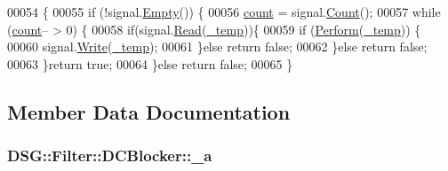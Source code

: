 \begin{DoxyCode}
00054                                                                     \{
00055             \textcolor{keywordflow}{if} (!signal.\hyperlink{class_d_s_g_1_1_ring_buffer_ac1346f5842d08b988a5297abe4089b96}{Empty}()) \{
00056                 \hyperlink{class_d_s_g_1_1_filter_1_1_d_c_blocker_a2a045707b5b79e7a4330c87156f7b344}{count} = signal.\hyperlink{class_d_s_g_1_1_ring_buffer_a9bd79b0a6dff618b205e396c101ee070}{Count}();
00057                 \textcolor{keywordflow}{while} (\hyperlink{class_d_s_g_1_1_filter_1_1_d_c_blocker_a2a045707b5b79e7a4330c87156f7b344}{count}-- > 0) \{
00058                     \textcolor{keywordflow}{if}(signal.\hyperlink{class_d_s_g_1_1_ring_buffer_a6b2848a64f15c7b0c320779582fa0fbe}{Read}(\hyperlink{class_d_s_g_1_1_filter_1_1_d_c_blocker_a4a698e11be27e8613f5b5146df9c4599}{\_temp}))\{
00059                         \textcolor{keywordflow}{if} (\hyperlink{class_d_s_g_1_1_filter_1_1_d_c_blocker_a9757794b5f9b7789132e5eaa44e07cef}{Perform}(\hyperlink{class_d_s_g_1_1_filter_1_1_d_c_blocker_a4a698e11be27e8613f5b5146df9c4599}{\_temp})) \{
00060                             signal.\hyperlink{class_d_s_g_1_1_ring_buffer_aa5dd2caa0a270173251faee40a43d692}{Write}(\hyperlink{class_d_s_g_1_1_filter_1_1_d_c_blocker_a4a698e11be27e8613f5b5146df9c4599}{\_temp});
00061                         \}\textcolor{keywordflow}{else} \textcolor{keywordflow}{return} \textcolor{keyword}{false};
00062                     \}\textcolor{keywordflow}{else} \textcolor{keywordflow}{return} \textcolor{keyword}{false};
00063                 \}\textcolor{keywordflow}{return} \textcolor{keyword}{true};
00064             \}\textcolor{keywordflow}{else} \textcolor{keywordflow}{return} \textcolor{keyword}{false};
00065         \}
\end{DoxyCode}


\subsection{Member Data Documentation}
\hypertarget{class_d_s_g_1_1_filter_1_1_d_c_blocker_ac048fff815764f3ad6d73b27553234c8}{
\subsubsection[{\+\_\+a}]{ D\+S\+G\+::\+Filter\+::\+D\+C\+Blocker\+::\+\_\+a\hspace{0.3cm}{\ttfamily [protected]}}}\label{class_d_s_g_1_1_filter_1_1_d_c_blocker_ac048fff815764f3ad6d73b27553234c8}


